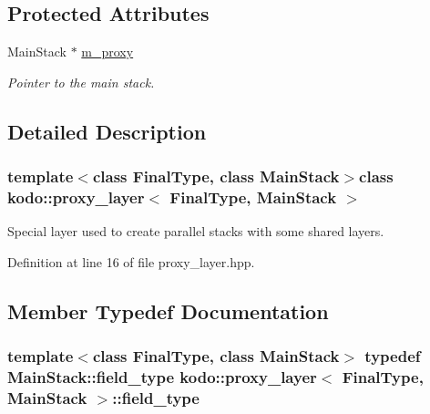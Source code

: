 \subsection*{Protected Attributes}
\begin{DoxyCompactItemize}
\item 
\hypertarget{classkodo_1_1proxy__layer_a8a43f63b9a22bd17eccd3e435d4561f3}{Main\-Stack $\ast$ \hyperlink{classkodo_1_1proxy__layer_a8a43f63b9a22bd17eccd3e435d4561f3}{m\-\_\-proxy}}\label{classkodo_1_1proxy__layer_a8a43f63b9a22bd17eccd3e435d4561f3}

\begin{DoxyCompactList}\small\item\em Pointer to the main stack. \end{DoxyCompactList}\end{DoxyCompactItemize}


\subsection{Detailed Description}
\subsubsection*{template$<$class Final\-Type, class Main\-Stack$>$class kodo\-::proxy\-\_\-layer$<$ Final\-Type, Main\-Stack $>$}

Special layer used to create parallel stacks with some shared layers. 

Definition at line 16 of file proxy\-\_\-layer.\-hpp.



\subsection{Member Typedef Documentation}
\hypertarget{classkodo_1_1proxy__layer_a236cbb490120ba8f7ae79482319df6cc}{
\subsubsection[{field\-\_\-type}]{\setlength{\rightskip}{0pt plus 5cm}template$<$class Final\-Type, class Main\-Stack$>$ typedef Main\-Stack\-::field\-\_\-type {\bf kodo\-::proxy\-\_\-layer}$<$ Final\-Type, Main\-Stack $>$\-::{\bf field\-\_\-type}}}\label{classkodo_1_1proxy__layer_a236cbb490120ba8f7ae79482319df6cc}




